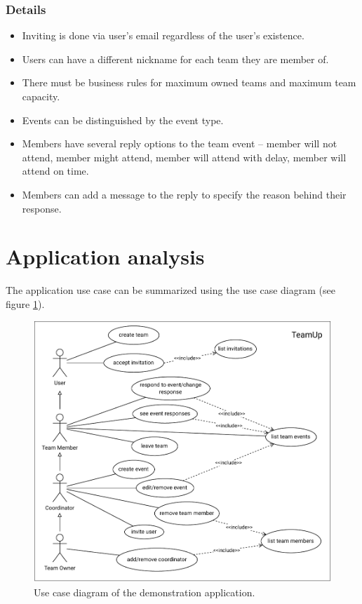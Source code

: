 \subsubsection{Details}
\begin{itemize}
    \item Inviting is done via user's email regardless of the user's existence.
    \item Users can have a different nickname for each team they are member of.
    \item There must be business rules for maximum owned teams and maximum team capacity.
    \item Events can be distinguished by the event type.
    \item Members have several reply options to the team event -- member will not attend, member might attend, member will attend with delay, member will attend on time.
    \item Members can add a message to the reply to specify the reason behind their response.
\end{itemize}

\section{Application analysis}
\label{dev:analysis}
The application use case can be summarized using the use case diagram (see figure \ref{fig:dev_usecase}).

\begin{figure} [H]
    \centering
    \includegraphics[width=1\textwidth]{figures/usecase.pdf}
    \caption{Use case diagram of the demonstration application.}
    \label{fig:dev_usecase}
\end{figure}

